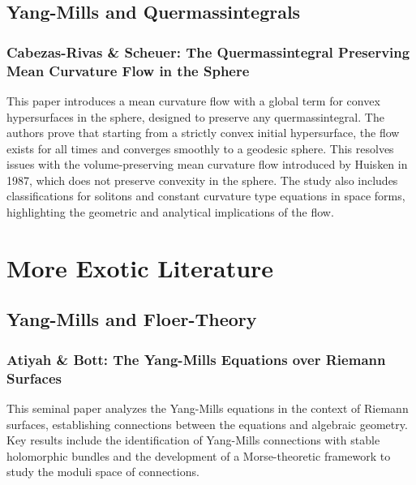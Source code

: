 \documentclass[10pt, letterpaper]{article}
\begin{document}
\subsection{Yang-Mills and Quermassintegrals}

\subsubsection{Cabezas-Rivas \& Scheuer: The Quermassintegral Preserving Mean Curvature Flow in the Sphere \cite{cabezasrivas2022quermassintegral}} 
This paper introduces a mean curvature flow with a global term for convex hypersurfaces in the sphere, designed to preserve any quermassintegral. The authors prove that starting from a strictly convex initial hypersurface, the flow exists for all times and converges smoothly to a geodesic sphere. This resolves issues with the volume-preserving mean curvature flow introduced by Huisken in 1987, which does not preserve convexity in the sphere. The study also includes classifications for solitons and constant curvature type equations in space forms, highlighting the geometric and analytical implications of the flow.






\vspace{1cm}





\section{More Exotic Literature}

\subsection{Yang-Mills and Floer-Theory}


\subsubsection{Atiyah \& Bott: The Yang-Mills Equations over Riemann Surfaces \cite{atiyah1983yangmills}} 
This seminal paper analyzes the Yang-Mills equations in the context of Riemann surfaces, establishing connections between the equations and algebraic geometry. Key results include the identification of Yang-Mills connections with stable holomorphic bundles and the development of a Morse-theoretic framework to study the moduli space of connections.
\end{document}

